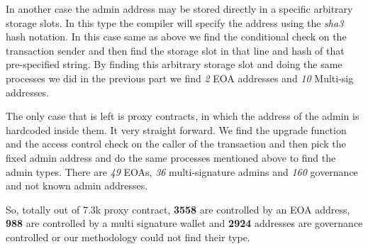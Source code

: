 In another case the admin address may be stored directly in a specific arbitrary storage slots. In this type the compiler will specify the address using the \textit{sha3} hash notation. In this case same as above we find the conditional check on the transaction sender and then find the storage slot in that line and hash of that pre-specified string. 
By finding this arbitrary storage slot and doing the same processes we did in the previous part we find \textit{2} EOA addresses and \textit{10} Multi-sig addresses.

The only case that is left is proxy contracts, in which the address of the admin is hardcoded inside them. It very straight forward. We find the upgrade function and the access control check on the caller of the transaction and then pick the fixed admin address and do the same processes mentioned above to find the admin types. There are \textit{49} EOAs, \textit{36} multi-signature admins and \textit{160} governance and not known admin addresses. 

So, totally out of 7.3k proxy contract, \textbf{3558} are controlled by an EOA address, \textbf{988} are controlled by a multi signature wallet and \textbf{2924} addresses are governance controlled or our methodology could not find their type.





